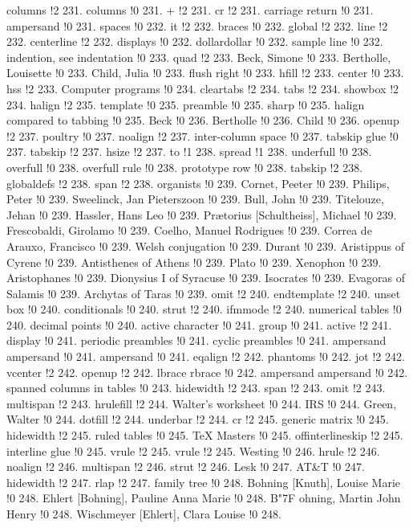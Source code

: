 columns !2 231.
columns !0 231.
+ !2 231.
cr !2 231.
carriage return !0 231.
ampersand !0 231.
spaces !0 232.
it !2 232.
braces !0 232.
global !2 232.
line !2 232.
centerline !2 232.
displays !0 232.
dollardollar !0 232.
sample line !0 232.
indention, see indentation !0 233.
quad !2 233.
Beck, Simone !0 233.
Bertholle, Louisette !0 233.
Child, Julia !0 233.
flush right !0 233.
hfill !2 233.
center !0 233.
hss !2 233.
Computer programs !0 234.
cleartabs !2 234.
tabs !2 234.
showbox !2 234.
halign !2 235.
template !0 235.
preamble !0 235.
sharp !0 235.
halign compared to tabbing !0 235.
Beck !0 236.
Bertholle !0 236.
Child !0 236.
openup !2 237.
poultry !0 237.
noalign !2 237.
inter-column space !0 237.
tabskip glue !0 237.
tabskip !2 237.
hsize !2 237.
to !1 238.
spread !1 238.
underfull !0 238.
overfull !0 238.
overfull rule !0 238.
prototype row !0 238.
tabskip !2 238.
globaldefs !2 238.
span !2 238.
organists !0 239.
Cornet, Peeter !0 239.
Philips, Peter !0 239.
Sweelinck, Jan Pieterszoon !0 239.
Bull, John !0 239.
Titelouze, Jehan !0 239.
Hassler, Hans Leo !0 239.
Pr\ae torius [Schultheiss], Michael !0 239.
Frescobaldi, Girolamo !0 239.
Coelho, Manuel Rodrigues !0 239.
Correa de Arauxo, Francisco !0 239.
Welsh conjugation !0 239.
Durant !0 239.
Aristippus of Cyrene !0 239.
Antisthenes of Athens !0 239.
Plato !0 239.
Xenophon !0 239.
Aristophanes !0 239.
Dionysius I of Syracuse !0 239.
Isocrates !0 239.
Evagoras of Salamis !0 239.
Archytas of Taras !0 239.
omit !2 240.
endtemplate !2 240.
unset box !0 240.
conditionals !0 240.
strut !2 240.
ifmmode !2 240.
numerical tables !0 240.
decimal points !0 240.
active character !0 241.
group !0 241.
active !2 241.
display !0 241.
periodic preambles !0 241.
cyclic preambles !0 241.
ampersand ampersand !0 241.
ampersand !0 241.
eqalign !2 242.
phantoms !0 242.
jot !2 242.
vcenter !2 242.
openup !2 242.
lbrace rbrace !0 242.
ampersand ampersand !0 242.
spanned columns in tables !0 243.
hidewidth !2 243.
span !2 243.
omit !2 243.
multispan !2 243.
hrulefill !2 244.
Walter's worksheet !0 244.
IRS !0 244.
Green, Walter !0 244.
dotfill !2 244.
underbar !2 244.
cr !2 245.
generic matrix !0 245.
hidewidth !2 245.
ruled tables !0 245.
TeX Masters !0 245.
offinterlineskip !2 245.
interline glue !0 245.
vrule !2 245.
vrule !2 245.
Westing !0 246.
hrule !2 246.
noalign !2 246.
multispan !2 246.
strut !2 246.
Lesk !0 247.
AT\&T !0 247.
hidewidth !2 247.
rlap !2 247.
family tree !0 248.
Bohning [Knuth], Louise Marie !0 248.
Ehlert [Bohning], Pauline Anna Marie !0 248.
B{\accent "7F o}hning, Martin John Henry !0 248.
Wischmeyer [Ehlert], Clara Louise !0 248.
